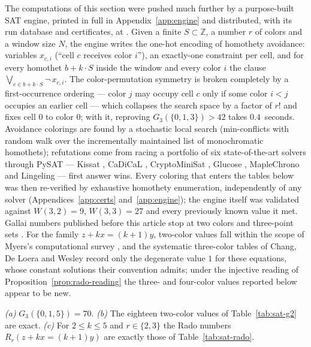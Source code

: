 \documentclass[12pt]{article}
\newcommand{\Wvdw}{W}
\newcommand{\Z}{\mathbb{Z}}
\begin{document}
The computations of this section were pushed much further by a
purpose-built SAT engine, printed in full in Appendix~\ref{app:engine}
and distributed, with its run database and certificates, at
\cite{hjcerts}. Given a finite $S\subset\Z$, a number $r$ of colors
and a window size $N$, the engine writes the one-hot encoding of
homothety avoidance: variables $x_{c,i}$ (``cell $c$ receives color
$i$''), an exactly-one constraint per cell, and for every homothet
$b+k\cdot S$ inside the window and every color $i$ the clause
$\bigvee_{c\in b+k\cdot S}\neg\,x_{c,i}$. The color-permutation
symmetry is broken completely by a first-occurrence ordering ---
color $j$ may occupy cell $c$ only if some color $i<j$ occupies an
earlier cell --- which collapses the search space by a factor of $r!$
and fixes cell $0$ to color $0$; with it, reproving
$G_{3}(\{0,1,3\})>42$ takes $0.4$~seconds. Avoidance colorings are
found by a stochastic local search (min-conflicts with random walk
over the incrementally maintained list of monochromatic homothets);
refutations come from racing a portfolio of six state-of-the-art
solvers through PySAT \cite{pysat2018} --- Kissat \cite{kissat2022},
CaDiCaL \cite{cadical2020}, CryptoMiniSat \cite{cryptominisat2009},
Glucose \cite{AudemardSimon2009}, MapleChrono
\cite{maplesat2016,NadelRyvchin2018} and
Lingeling \cite{lingeling2013} --- first answer wins. Every coloring
that enters the tables below was then re-verified by exhaustive
homothety enumeration, independently of any solver
(Appendices~\ref{app:certs} and~\ref{app:engine}); the engine itself
was validated against $\Wvdw(3,2)=9$, $\Wvdw(3,3)=27$ and every
previously known value it met. Gallai numbers published before this
article stop at two colors and three-point sets
\cite{BrownLandmanMishna1997,KimRho2012}. For the family
$z+kx=(k+1)y$, two-color values fall within the scope of Myers's
computational survey \cite{myers2015}, and the systematic three-color
tables of Chang, De Loera and Wesley \cite{ChangDeLoeraWesley2022}
record only the degenerate value $1$ for these equations, whose
constant solutions their convention admits; under the injective
reading of Proposition~\ref{prop:rado-reading} the three- and
four-color values reported below appear to be new.

\begin{theorem}\label{thm:sat-gallai}
\emph{(a)} $G_{3}(\{0,1,5\})=70$.
\emph{(b)} The eighteen two-color values of Table~\ref{tab:sat-g2}
are exact.
\emph{(c)} For $2\le k\le 5$ and $r\in\{2,3\}$ the Rado numbers
$R_{r}(z+kx=(k+1)y)$ are exactly those of Table~\ref{tab:sat-rado}.
\end{theorem}
\end{document}
